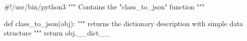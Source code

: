 #!/usr/bin/python3
"""
Contains the "class_to_json" function
"""


def class_to_json(obj):
    """
    returns the dictionary description with simple data structure
    """
    return obj.__dict__
